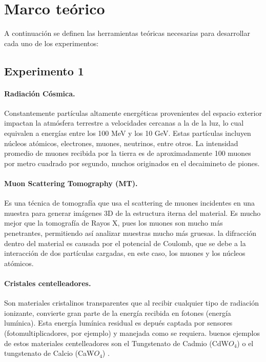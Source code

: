 \documentclass[notitlepage,letterpaper,12pt]{article} %
\begin{document}


\section{Marco teórico}
A continuación se definen las herramientas teóricas necesarias para desarrollar cada uno de los experimentos:
\subsection{Experimento 1}
\paragraph{Radiación Cósmica.} Constantemente partículas altamente energéticas provenientes del espacio exterior impactan la atmósfera terrestre a velocidades cercanas a la de la luz, lo cual equivalen a energías entre los 100 MeV y los 10 GeV. Estas partículas incluyen núcleos atómicos, electrones, muones, neutrinos, entre otros. La intensidad promedio de muones recibida por la tierra es de aproximadamente 100 muones por metro cuadrado por segundo, muchos originados en el decaimineto de piones.\cite{nasa}\cite{caltech}
\paragraph{Muon Scattering Tomography (MT).} Es una técnica de tomografía que usa el scattering de muones incidentes en una muestra para generar imágenes 3D de la estructura iterna del material. Es mucho mejor que  la tomografía de Rayos X, pues los muones son mucho más penetrantes, permitiendo así analizar muestras mucho más gruesas. la difracción dentro del material es causada por el potencial de Coulomb, que se debe a la interacción de dos partículas cargadas, en este caso, los muones y los núcleos atómicos\cite{princeton}.
\paragraph{Cristales centelleadores.} Son materiales cristalinos transparentes que al recibir cualquier tipo de radiación ionizante, convierte gran parte de la energía recibida en fotones (energía lumínica). Esta energía lumínica residual es depués captada por sensores (fotomultiplicadores, por ejemplo) y manejada como se requiera. buenos ejemplos de estos materiales centelleadores son el Tungstenato de Cadmio (CdW$O_{4}$) o el tungstenato de Calcio (CaW$O_{4}$) .
\end{document}
